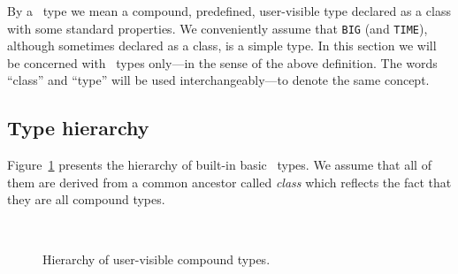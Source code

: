 By a \smurph\ type we mean a compound, predefined, user-visible
type declared as a class with some standard properties.
We conveniently assume that {\tt BIG} (and {\tt TIME}), although sometimes
declared as a class, is a simple type.
In this section we will be concerned with \smurph\ types only---in the sense of
the above definition.
The words ``class'' and ``type'' will be used interchangeably---to
denote the same concept.

\subsection{Type hierarchy}
\label{rm_st_th}

Figure~\ref{ty_hi}
presents the hierarchy of built-in basic \smurph\ types.
We assume that all of them are derived from a common ancestor called
{\em class} which reflects the fact that they are all compound types.

\begin{figure}
\begin{center}
\ 
\caption{Hierarchy of user-visible compound types.}%
\label{ty_hi}
\end{center}
\end{figure}


